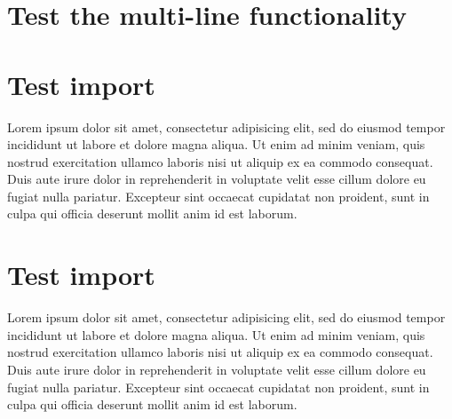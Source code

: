 \documentclass[]{memoir}
\begin{document}
\chapter{Test the multi-line functionality}



\chapter{Test import}

Lorem ipsum dolor sit amet, consectetur adipisicing elit, sed do eiusmod
tempor incididunt ut labore et dolore magna aliqua. Ut enim ad minim veniam,
quis nostrud exercitation ullamco laboris nisi ut aliquip ex ea commodo
consequat. Duis aute irure dolor in reprehenderit in voluptate velit esse
cillum dolore eu fugiat nulla pariatur. Excepteur sint occaecat cupidatat non
proident, sunt in culpa qui officia deserunt mollit anim id est laborum.

\chapter{Test import}

Lorem ipsum dolor sit amet, consectetur adipisicing elit, sed do eiusmod
tempor incididunt ut labore et dolore magna aliqua. Ut enim ad minim veniam,
quis nostrud exercitation ullamco laboris nisi ut aliquip ex ea commodo
consequat. Duis aute irure dolor in reprehenderit in voluptate velit esse
cillum dolore eu fugiat nulla pariatur. Excepteur sint occaecat cupidatat non
proident, sunt in culpa qui officia deserunt mollit anim id est laborum.

\end{document}

